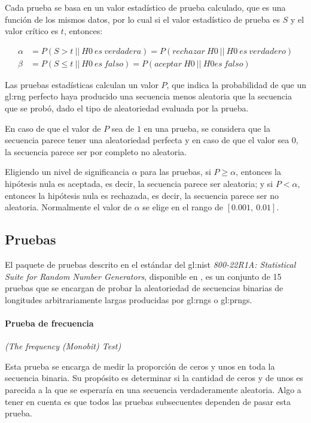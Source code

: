 Cada prueba se basa en un valor estadístico de prueba calculado, que es una 
función de los mismos datos, por lo cual si el valor estadístico de prueba 
es $S$ y el valor crítico es $t$, entonces:

\begin{align}
  \alpha &= P(S > t\: ||\: H0\: es\: verdadera) 
          = P(rechazar\: H0\: ||\: H0\: es\: verdadero)\\
  \beta  &= P(S \leq t\: ||\: H0\: es\: falso) 
          = P(aceptar\: H0\: ||\: H0 es\: falso)
\end{align}

Las pruebas estadísticas calculan un valor $P$, que indica la probabilidad de 
que un \gls{gl:rng} perfecto haya producido una secuencia menos aleatoria que 
la secuencia que se probó, dado el tipo de aleatoriedad evaluada por la prueba. 

En caso de que el valor de $P$ sea de $1$ en una prueba, se considera que la 
secuencia parece tener una aleatoriedad perfecta y en caso de que el valor 
sea $0$, la secuencia parece ser por completo no aleatoria.

Eligiendo un nivel de significancia $\alpha$ para las pruebas, si $P \geq 
\alpha$, entonces la hipótesis nula es aceptada, es decir, la secuencia 
parece ser aleatoria; y si $P < \alpha$, entonces la hipótesis nula es 
rechazada, es decir, la secuencia parece ser no aleatoria. Normalmente 
el valor de $\alpha$ se elige en el rango de $[0.001,\: 0.01]$.

\subsection{Pruebas} %
\label{sec:lista_pruebas}

El paquete de pruebas descrito en el estándar del \gls{gl:nist} 
\textit{800-22R1A: Statistical Suite for Random Number Generators}, disponible 
en \cite{nist_pruebas}, es un conjunto de 15 pruebas que se encargan de probar 
la aleatoriedad de secuencias binarias de longitudes arbitrariamente largas 
producidas por \gls{gl:rng}s o \gls{gl:prng}s.

\paragraph{Prueba de frecuencia} %
\textit{(The frequency (Monobit) Test)}

Esta prueba se encarga de medir la proporción de ceros y unos en toda la 
secuencia binaria. Su propósito es determinar si la cantidad de ceros y de 
unos es parecida a la que se esperaría en una secuencia verdaderamente 
aleatoria. Algo a tener en cuenta es que todos las pruebas subsecuentes 
dependen de pasar esta prueba.

